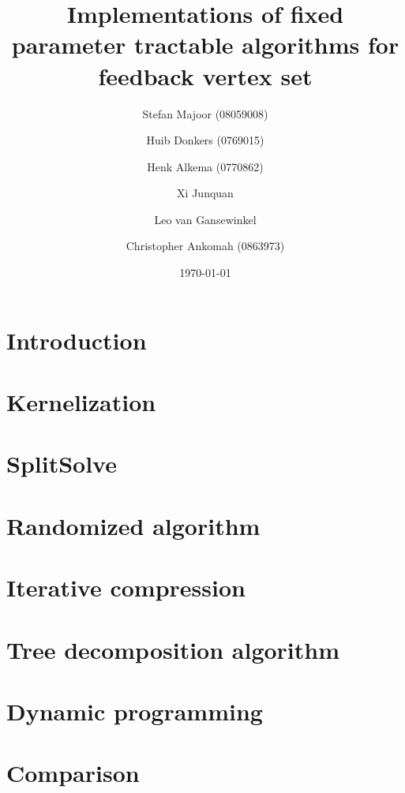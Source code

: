 \documentclass[a4paper,10pt]{article}
\title{Implementations of fixed parameter tractable algorithms for feedback vertex set}
\author{
	Stefan Majoor (08059008)
	\and
	Huib Donkers (0769015)
	\and
	Henk Alkema (0770862)
	\and
	Xi Junquan
	\and
	Leo van Gansewinkel
	\and
	Christopher Ankomah (0863973)
}
\date{\today}
\begin{document}
\maketitle
\clearpage
\setcounter{tocdepth}{2}
\tableofcontents
\clearpage

\begin{abstract}

\end{abstract}

\section{Introduction} \label{sec:intro}


\section{Kernelization} \label{sec:kern}


\section{SplitSolve} \label{sec:splitsolve}


\section{Randomized algorithm} \label{sec:rand}


\section{Iterative compression} \label{sec:itcomp}


\section{Tree decomposition algorithm} \label{sec:treewidth}


\section{Dynamic programming} \label{sec:dynamic program}


\section{Comparison} \label{sec:comparison}

\end{document}

